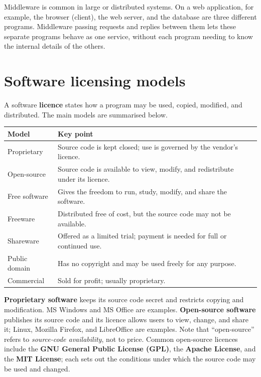 Middleware is common in large or distributed systems. On a web application,
for example, the browser (client), the web server, and the database are three
different programs. Middleware passing requests and replies between them lets
these separate programs behave as one service, without each program needing to
know the internal details of the others.

\section{Software licensing models}
A software \textbf{licence} states how a program may be used, copied, modified,
and distributed. The main models are summarised below.

\begin{center}
\begin{tabular}{p{}p{}}
\toprule
\textbf{Model} & \textbf{Key point} \\
\midrule
Proprietary & Source code is kept closed; use is governed by the vendor's licence. \\
Open-source & Source code is available to view, modify, and redistribute under its licence. \\
Free software & Gives the freedom to run, study, modify, and share the software. \\
Freeware & Distributed free of cost, but the source code may not be available. \\
Shareware & Offered as a limited trial; payment is needed for full or continued use. \\
Public domain & Has no copyright and may be used freely for any purpose. \\
Commercial & Sold for profit; usually proprietary. \\
\bottomrule
\end{tabular}
\end{center}

\textbf{Proprietary software} keeps its source code secret and restricts
copying and modification. MS Windows and MS Office are examples.
\textbf{Open-source software} publishes its source code and its licence allows
users to view, change, and share it; Linux, Mozilla Firefox, and LibreOffice
are examples. Note that ``open-source'' refers to \emph{source-code
availability}, not to price. Common open-source licences include the
\textbf{GNU General Public License (GPL)}, the \textbf{Apache License}, and the
\textbf{MIT License}; each sets out the conditions under which the source code
may be used and changed.

